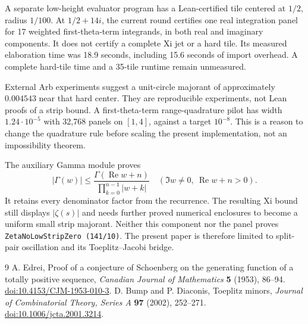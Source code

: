 \documentclass[11pt]{amsart}
\newcommand{\Repart}{\operatorname{Re}}
\begin{document}
A separate low-height evaluator program has a Lean-certified tile centered at $1/2$, radius $1/100$. At $1/2+14i$, the current round certifies one real integration panel for 17 weighted first-theta-term integrands, in both real and imaginary components. It does not certify a complete Xi jet or a hard tile. Its measured elaboration time was 18.9 seconds, including 15.6 seconds of import overhead. A complete hard-tile time and a 35-tile runtime remain unmeasured.

External Arb experiments suggest a unit-circle majorant of approximately $0.004543$ near that hard center. They are reproducible experiments, not Lean proofs of a strip bound. A first-theta-term range-quadrature pilot has width $1.24\cdot10^{-5}$ with 32,768 panels on $[1,4]$, against a target $10^{-8}$. This is a reason to change the quadrature rule before scaling the present implementation, not an impossibility theorem.

The auxiliary Gamma module proves
\[
 |\Gamma(w)|\le
 \frac{\Gamma(\Repart w+n)}{\prod_{k=0}^{n-1}|w+k|}
 \quad(\Im w\ne0,\ \Repart w+n>0).
\]
It retains every denominator factor from the recurrence. The resulting Xi bound still displays $|\zeta(s)|$ and needs further proved numerical enclosures to become a uniform small strip majorant. Neither this component nor the panel proves
\texttt{ZetaNoLowStripZero (141/10)}. The present paper is therefore limited to split-pair oscillation and its Toeplitz--Jacobi bridge.

\begin{thebibliography}{9}
A. Edrei, Proof of a conjecture of Schoenberg on the generating function of a totally positive sequence, \emph{Canadian Journal of Mathematics} \textbf{5} (1953), 86--94.
\href{https://doi.org/10.4153/CJM-1953-010-3}{doi:10.4153/CJM-1953-010-3}.
D. Bump and P. Diaconis, Toeplitz minors, \emph{Journal of Combinatorial Theory, Series A} \textbf{97} (2002), 252--271.
\href{https://doi.org/10.1006/jcta.2001.3214}{doi:10.1006/jcta.2001.3214}.
\end{thebibliography}
\end{document}
